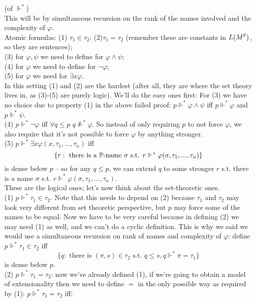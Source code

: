 \documentclass[a4paper]{article}
\begin{document}
\begin{defi} (of $\Vdash^*$)\\
This will be by simultaneous recursion on the rank of the names involved and the complexity of $\varphi$.\\
Atomic formulas: (1) $\tau_1 \in \tau_2$; (2)$\tau_1 = \tau_2$ (remember these are constants in $L(M^\P)$, so they are sentences);\\
(3) for $\varphi,\psi$ we need to define for $\varphi \wedge \psi$;\\
(4) for $\varphi$ we need to define for $\neg \varphi$;\\
(5) for $\varphi$ we need for $\exists x \varphi$.\\
In this setting (1) and (2) are the hardest (after all, they are where the set theory lives in, as (3)-(5) are purely logic). We'll do the easy ones first:
For (3) we have no choice due to property (1) in the above failed proof: $p \Vdash^* \varphi \wedge \psi$ iff $p \Vdash^* \varphi$ and $p \Vdash^* \psi$.\\
(4) $p \Vdash^* \neg \varphi$ iff $\forall q \leq p$ $q \not\Vdash^* \varphi$. So instead of only requiring $p$ to not force $\varphi$, we also require that it's not possible to force $\varphi$ by anything stronger.\\
(5) $p \Vdash^* \exists x \varphi(x,\tau_1,...,\tau_n)$ iff 
\[
\{r: \text{ there is a } \P \text{-name }\sigma \text{ s.t. } r \Vdash^*\varphi(\sigma,\tau_1,...,\tau_n)\}
\]
is dense below $p$ -- so for any $q \leq p$, we can extend $q$ to some stronger $r$ s.t. there is a name $\sigma$ s.t. $r \Vdash^* \varphi(\sigma,\tau_1,...,\tau_n)$.\\
These are the logical ones; let's now think about the set-theoretic ones.\\
(1) $p \Vdash^* \tau_1 \in \tau_2$. Note that this needs to depend on (2) because $\tau_1$ and $\tau_2$ may look very different from set theoretic perspective, but $p$ may force some of the names to be equal. Now we have to be very careful because in defining (2) we may need (1) as well, and we can't do a cyclic definition. This is why we said we would use a simultaneous recursion on rank of names and complexity of $\varphi$: define $p \Vdash^* \tau_1 \in \tau_2$ iff 
\[
\{q:\text{ there is }(\pi,s) \in \tau_2 \text{ s.t. } q \leq s,q \Vdash^* \pi = \tau_1\}
\]
is dense below $p$.\\
(2) $p \Vdash^* \tau_1 =\tau_2$: now we've already defined (1), if we're going to obtain a model of extensionality then we need to define $=$ in the only possible way as required by (1): $p \Vdash^* \tau_1 = \tau_2$ iff:\\

\end{defi}
\end{document}
